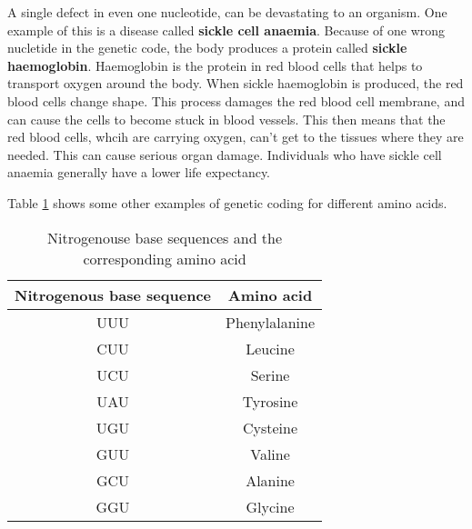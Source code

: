 \begin{IFact}{
A single defect in even one nucleotide, can be devastating to an organism. One example of this is a disease called \textbf{sickle cell anaemia}. Because of one wrong nucletide in the genetic code, the body produces a protein called \textbf{sickle haemoglobin}. Haemoglobin is the protein in red blood cells that helps to transport oxygen around the body. When sickle haemoglobin is produced, the red blood cells change shape. This process damages the red blood cell membrane, and can cause the cells to become stuck in blood vessels. This then means that the red blood cells, whcih are carrying oxygen, can't get to the tissues where they are needed. This can cause serious organ damage. Individuals who have sickle cell anaemia generally have a lower life expectancy. 
}
\end{IFact}

Table \ref{tab:amino acids} shows some other examples of genetic coding for different amino acids.\\

\begin{table}[h]
\begin{center}
\caption{Nitrogenouse base sequences and the corresponding amino acid}
\label{tab:amino acids}
\begin{tabular}{|c|c|}\hline
\textbf{Nitrogenous base sequence} & \textbf{Amino acid} \\\hline
UUU & Phenylalanine \\\hline
CUU & Leucine \\\hline
UCU & Serine \\\hline
UAU & Tyrosine \\\hline
UGU & Cysteine \\\hline
GUU & Valine \\\hline
GCU & Alanine \\\hline
GGU & Glycine \\\hline
\end{tabular}
\end{center}
\end{table}

